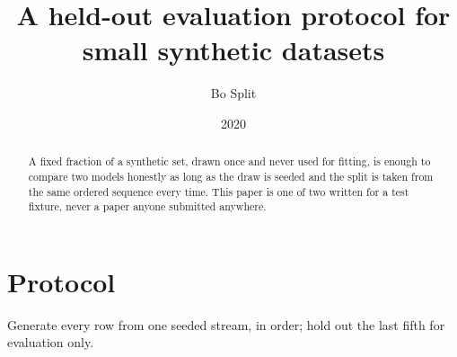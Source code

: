\documentclass{article}
\title{A held-out evaluation protocol for small synthetic datasets}
\author{Bo Split}
\date{2020}
\begin{document}
\maketitle
\begin{abstract}
A fixed fraction of a synthetic set, drawn once and never used for fitting, is enough to compare
two models honestly as long as the draw is seeded and the split is taken from the same ordered
sequence every time. This paper is one of two written for a test fixture, never a paper anyone
submitted anywhere.
\end{abstract}
\section{Protocol}
Generate every row from one seeded stream, in order; hold out the last fifth for evaluation only.
\end{document}
